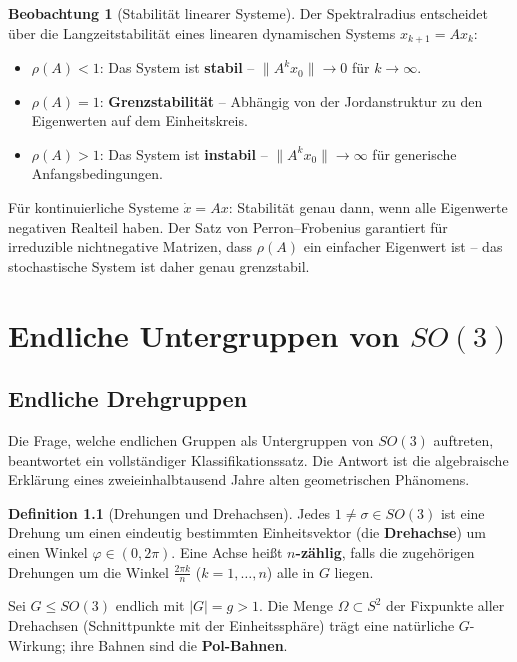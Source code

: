 ﻿\documentclass[a4paper,12pt]{report}
\theoremstyle{definition}
\newtheorem{definition}{Definition}
\newtheorem{beobachtung}{Beobachtung}
\begin{document}
\begin{beobachtung}[Stabilität linearer Systeme]
    Der Spektralradius entscheidet über die Langzeitstabilität eines
    linearen dynamischen Systems $x_{k+1} = Ax_k$:
    \begin{itemize}
        \item[-] $\rho(A) < 1$: Das System ist \textbf{stabil} --
              $\|A^k x_0\| \to 0$ für $k \to \infty$.
        \item[-] $\rho(A) = 1$: \textbf{Grenzstabilität} --
              Abhängig von der Jordanstruktur zu den Eigenwerten
              auf dem Einheitskreis.
        \item[-] $\rho(A) > 1$: Das System ist \textbf{instabil} --
              $\|A^k x_0\| \to \infty$ für generische Anfangsbedingungen.
    \end{itemize}
    Für kontinuierliche Systeme $\dot{x} = Ax$: Stabilität genau
    dann, wenn alle Eigenwerte negativen Realteil haben.
    Der Satz von Perron--Frobenius garantiert für irreduzible
    nichtnegative Matrizen, dass $\rho(A)$ ein einfacher Eigenwert ist --
    das stochastische System ist daher genau grenzstabil.
\end{beobachtung}

\chapter{Endliche Untergruppen von $SO(3)$}

\section{Endliche Drehgruppen}

Die Frage, welche endlichen Gruppen als Untergruppen von $SO(3)$ auftreten,
beantwortet ein vollständiger Klassifikationssatz. Die Antwort ist
die algebraische Erklärung eines zweieinhalbtausend Jahre alten geometrischen Phänomens.

\begin{definition}[Drehungen und Drehachsen]
    Jedes $1 \neq \sigma \in SO(3)$ ist eine Drehung um einen eindeutig
    bestimmten Einheitsvektor (die \textbf{Drehachse}) um einen Winkel
    $\varphi \in (0, 2\pi)$. Eine Achse heißt \textbf{$n$-zählig},
    falls die zugehörigen Drehungen um die Winkel $\frac{2\pi k}{n}$
    ($k = 1, \ldots, n$) alle in $G$ liegen.

    Sei $G \leq SO(3)$ endlich mit $|G| = g > 1$.
    Die Menge $\Omega \subset S^2$ der Fixpunkte aller Drehachsen
    (Schnittpunkte mit der Einheitssphäre) trägt eine natürliche
    $G$-Wirkung; ihre Bahnen sind die \textbf{Pol-Bahnen}.
\end{definition}
\end{document}
